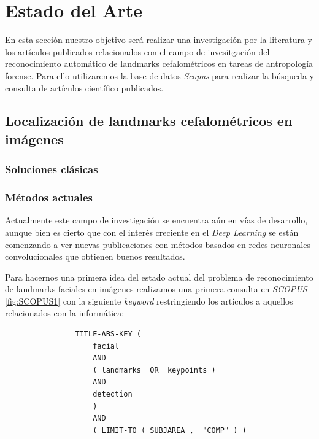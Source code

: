 
\chapter{Estado del Arte}

    \noindent En esta sección nuestro objetivo será realizar una investigación por la literatura y los artículos publicados relacionados con el campo de invesitgación del reconocimiento automático de landmarks cefalométricos en tareas de antropología forense. Para ello utilizaremos la base de datos \textit{Scopus} para realizar la búsqueda y consulta de artículos científico publicados.

    \section{Localización de landmarks cefalométricos en imágenes}
        \subsection{Soluciones clásicas}

        \subsection{Métodos actuales}
            \noindent Actualmente este campo de investigación se encuentra aún en vías de desarrollo, aunque bien es cierto que con el interés creciente en el \textit{Deep Learning} se están comenzando a ver nuevas publicaciones con métodos basados en redes neuronales convolucionales que obtienen buenos resultados. 

            \medskip

            \noindent Para hacernos una primera idea del estado actual del problema de reconocimiento de landmarks faciales en imágenes realizamos una primera consulta en \textit{SCOPUS} \autoref{fig:SCOPUS1} con la siguiente \textit{keyword} restringiendo los artículos a aquellos relacionados con la informática:
            
            \begin{verbatim}
                TITLE-ABS-KEY ( 
                    facial  
                    AND  
                    ( landmarks  OR  keypoints )  
                    AND  
                    detection 
                    )  
                    AND  
                    ( LIMIT-TO ( SUBJAREA ,  "COMP" ) )
            \end{verbatim}
            

